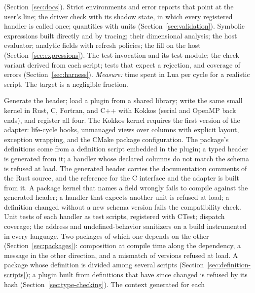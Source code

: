 \documentclass[11pt,a4paper]{article}
\begin{document}
\begin{description}[style=nextline,leftmargin=2em]
        (Section~\ref{sec:docs}).  Strict environments and error reports
        that point at the user's line; the driver check with its shadow
        state, in which every registered handler is called once; quantities
        with units (Section~\ref{sec:validation}).  Symbolic expressions
        built directly and by tracing; their dimensional analysis; the host
        evaluator; analytic fields with refresh policies; the fill on the
        host (Section~\ref{sec:expressions}).  The test invocation and its
        test module; the check variant derived from each script; tests that
        expect a rejection, and coverage of errors
        (Section~\ref{sec:harness}).
        \emph{Measure:} time spent in Lua per cycle for a realistic
        script.  The target is a negligible fraction.
  \item[M4. C interface and a foreign package.]
        Generate the header; load a plugin from a shared library; write the
        same small kernel in Rust, C, Fortran, and C++ with Kokkos (serial
        and OpenMP back ends), and register all four.  The Kokkos kernel
        requires the first version of the adapter: life-cycle hooks,
        unmanaged views over columns with explicit layout, exception
        wrapping, and the CMake package configuration.  The package's
        definitions come from a definition script embedded in the plugin; a
        typed header is generated from it; a handler whose declared columns
        do not match the schema is refused at load.  The generated header
        carries the documentation comments of the Rust source, and the
        reference for the C interface and the adapter is built from it.
        A package kernel that names a field wrongly fails to compile against
        the generated header; a handler that expects another unit is refused
        at load; a definition changed without a new schema version fails the
        compatibility check.  Unit tests of each handler as test scripts,
        registered with CTest; dispatch coverage; the address and
        undefined-behavior sanitizers on a build instrumented in every
        language.  Two packages of which one depends on the other
        (Section~\ref{sec:packages}): composition at compile time along the
        dependency, a message in the other direction, and a mismatch of
        versions refused at load.  A package whose definition is divided among
        several scripts (Section~\ref{sec:definition-scripts}); a plugin
        built from definitions that have since changed is refused by its hash
        (Section~\ref{sec:type-checking}).  The context generated for each

\end{description}
\end{document}
